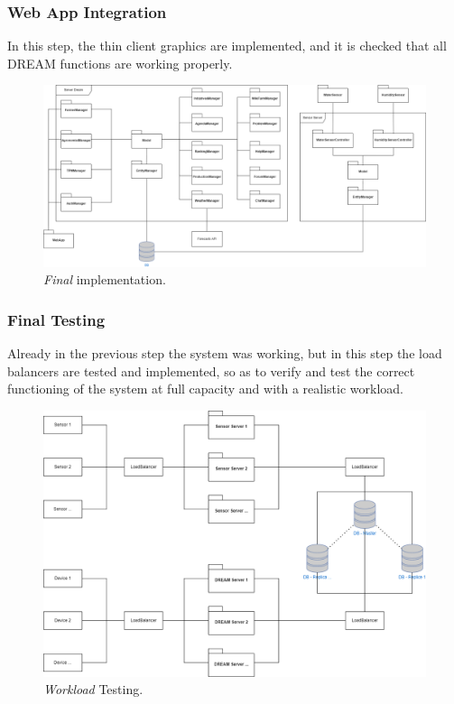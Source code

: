 \subsubsection{Web App Integration}
In this step, the thin client graphics are implemented, and it is checked that all DREAM functions are working properly.
\begin{figure}[H]
    \centering
    \includegraphics[width=\textwidth]{Images/StepImplementation/Step7.png}
    \caption{\textit{Final} implementation.}
\end{figure}
\newpage
\subsubsection{Final Testing}
Already in the previous step the system was working, but in this step the load balancers are tested and implemented, so as to verify and test the correct functioning of the system at full capacity and with a realistic workload.
\begin{figure}[H]
    \centering
    \includegraphics[width=\textwidth]{Images/StepImplementation/Step8.png}
    \caption{\textit{Workload} Testing.}
\end{figure}
\newpage
